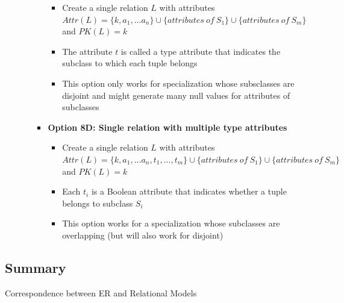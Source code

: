 \begin{itemize}[label=\(\rhd\)]
\begin{itemize}[label=\(\rhd\)]
\begin{itemize}[label=\(\rhd\)]
            \begin{itemize}[label=\(\rhd\)]
                \item Create a single relation $L$ with attributes $Attr(L)=\{k,a_1,...a_n\} \cup \{attributes\ of\ S_1\} \cup \{attributes\ of\ S_m\}$ and $PK(L)=k$
                \item The attribute $t$ is called a type attribute that indicates the subclass to which each tuple belongs
                \item This option only works for specialization whose subsclasses are disjoint and might generate many null values for attributes of subclasses
            \end{itemize}
            \item \textbf{Option 8D: Single relation with multiple type attributes}
            \begin{itemize}[label=\(\rhd\)]
                \item Create a single relation $L$ with attributes \\ $Attr(L) = \{k,a_1,...a_n, t_1,...,t_m\} \cup \{attributes\ of\ S_1\} \cup \{attributes\ of\ S_m\}$ and $PK(L)=k$ 
                \item Each $t_i$ is a Boolean attribute that indicates whether a tuple belongs to subclass $S_i$
                \item This option works for a specialization whose subclasses are overlapping (but will also work for disjoint)
            \end{itemize}
        \end{itemize}
    \end{itemize}
\end{itemize}

\subsection{Summary}
Correspondence between ER and Relational Models


